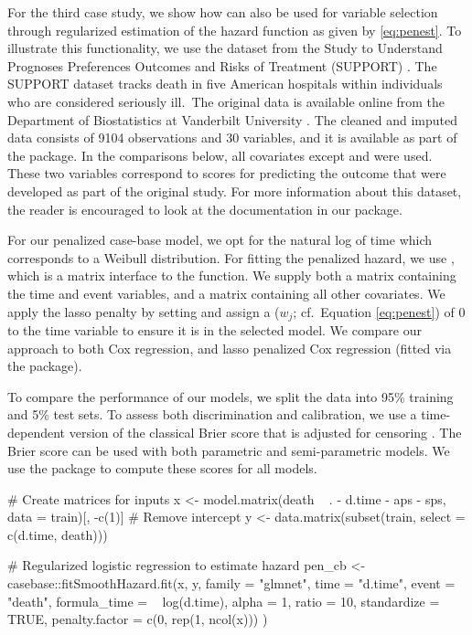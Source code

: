 For the third case study, we show how  can also be used
for variable selection through regularized estimation of the hazard
function as given by \eqref{eq:penest}. To illustrate this
functionality, we use the dataset from the Study to Understand Prognoses
Preferences Outcomes and Risks of Treatment (SUPPORT)
\citep{knaus1995support}. The SUPPORT dataset tracks death in five
American hospitals within individuals who are considered seriously
ill.~The original data is available online from the Department of
Biostatistics at Vanderbilt University \citep{harrell_2020}. The cleaned
and imputed data consists of 9104 observations and 30 variables, and it
is available as part of the  package. In the comparisons
below, all covariates except  and  were used. These
two variables correspond to scores for predicting the outcome that were
developed as part of the original study. For more information about this
dataset, the reader is encouraged to look at the documentation in our
package.

For our penalized case-base model, we opt for the natural log of time
which corresponds to a Weibull distribution. For fitting the penalized
hazard, we use , which is a matrix interface
to the  function. We supply both a matrix 
containing the time and event variables, and a matrix 
containing all other covariates. We apply the lasso penalty by setting
 and assign a  (\(w_j\);
cf.~Equation \ref{eq:penest}) of 0 to the time variable to ensure it is
in the selected model. We compare our approach to both Cox regression,
and lasso penalized Cox regression (fitted via the 
package).

To compare the performance of our models, we split the data into 95\%
training and 5\% test sets. To assess both discrimination and
calibration, we use a time-dependent version of the classical Brier
score that is adjusted for censoring \citep{graf1999ass}. The Brier
score can be used with both parametric and semi-parametric models. We
use the  package to compute these scores for all
models.

\begin{Schunk}
\begin{Sinput}
# Create matrices for inputs
x <- model.matrix(death ~ . - d.time - aps - sps, 
                  data = train)[, -c(1)] # Remove intercept
y <- data.matrix(subset(train, select = c(d.time, death)))

# Regularized logistic regression to estimate hazard
pen_cb <- casebase::fitSmoothHazard.fit(x, y,
  family = "glmnet",
  time = "d.time", event = "death",
  formula_time = ~ log(d.time), alpha = 1,
  ratio = 10, standardize = TRUE,
  penalty.factor = c(0, rep(1, ncol(x)))
)
\end{Sinput}
\end{Schunk}

